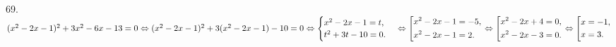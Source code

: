 69. $(x^2-2x-1)^2+3x^2-6x-13=0\Leftrightarrow(x^2-2x-1)^2+3(x^2-2x-1)-10=0\Leftrightarrow\begin{cases}x^2-2x-1=t,\\ t^2+3t-10=0.\end{cases}
\Leftrightarrow\left[
      \begin{gathered}
      x^2-2x-1=-5,\hfill\\
      x^2-2x-1=2.\hfill
      \end{gathered}\right.\Leftrightarrow\left[
      \begin{gathered}
      x^2-2x+4=0,\hfill\\
      x^2-2x-3=0.\hfill
      \end{gathered}\right.\Leftrightarrow\left[
      \begin{gathered}
      x=-1,\hfill\\
      x=3.\hfill
      \end{gathered}\right.$\\
